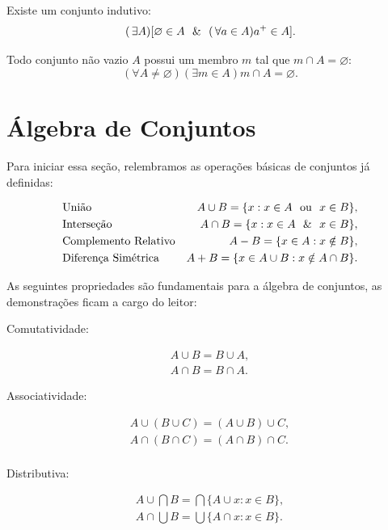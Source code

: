 \begin{axioma}
    \label{ax:infinito}
    Existe um conjunto indutivo:
    \[ (\exists A)[\varnothing \in A \e (\forall a \in A) a^{+} \in A]. \]
\end{axioma}

\begin{axioma}
    \label{ax:regularidade}
    Todo conjunto não vazio \(A\) possui um membro \(m\) tal que \(m \cap A =\varnothing\):
    \[
        (\forall A \neq \varnothing)(\exists m \in A)m \cap A = \varnothing.
    \]
\end{axioma}

\section{Álgebra de Conjuntos}
\label{sec:algebra_conjuntos}

Para iniciar essa seção, relembramos as operações básicas de conjuntos já definidas:

\begin{align*}
     & \text{União}                & A \cup B = \{x: x \in A \ \text{ ou }\  x \in B\},         \\
     & \text{Interseção}           & A \cap B = \{x: x \in A \ \ \& \ \  x \in B\},          \\
     & \text{Complemento Relativo} & A - B = \{x \in A: x \notin B\},               \\
     & \text{Diferença Simétrica}  & A + B = \{x \in A \cup B: x \notin A \cap B\}.
\end{align*}

As seguintes propriedades são fundamentais para a álgebra de conjuntos, as demonstrações ficam a cargo do leitor:

Comutatividade:

\begin{align*}
    A \cup B = B \cup A, \\
    A \cap B = B \cap A.
\end{align*}

Associatividade:

\begin{align*}
    A \cup (B \cup C) = (A \cup B) \cup C, \\
    A \cap (B \cap C) = (A \cap B) \cap C. \\
\end{align*}

Distributiva:

\begin{align*}
    A \cup \bigcap B = \bigcap \{A \cup x: x \in B\}, \\
    A \cap \bigcup B = \bigcup \{A \cap x: x \in B\}.
\end{align*}

